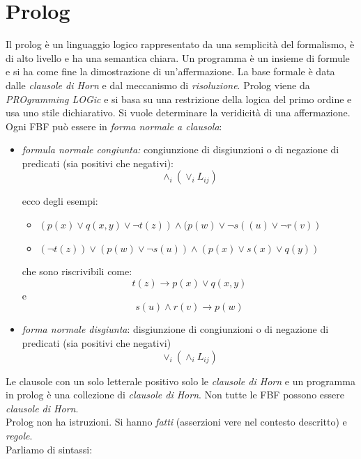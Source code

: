 \documentclass[a4paper,12pt, oneside]{book}
\begin{document}
\chapter{Prolog}
Il prolog è un linguaggio logico rappresentato da una semplicità del formalismo, è di alto livello e ha una semantica chiara. Un programma è un insieme di formule e si ha come fine la dimostrazione di un'affermazione. La base formale è data dalle \textit{clausole di Horn} e dal meccanismo di \textit{risoluzione}. Prolog viene da \textit{PROgramming LOGic} e si basa su una restrizione della logica del primo ordine e usa uno stile dichiarativo. Si vuole determinare la veridicità di una affermazione. Ogni FBF può essere in \textit{forma normale a clausola}:
\begin{itemize}
\item \textit{formula normale congiunta:} congiunzione di disgiunzioni o di negazione di predicati (sia positivi che negativi):
$$\wedge_i(\vee_iL_{ij})$$
\begin{esempio}
ecco degli esempi:
\begin{itemize}
\item $(p(x)\vee q(x,y)\vee \neg t(z))\wedge(p(w)\vee\neg s((u)\vee \neg r(v))$
\item $(\neg t(z))\vee (p(w)\vee\neg s(u))\wedge (p(x)\vee s(x)\vee q(y))$
\end{itemize}
che sono riscrivibili come:
$$t(z)\to p(x)\vee q(x,y)$$
e
$$s(u)\wedge r(v)\to p(w)$$
\end{esempio}
\item \textit{forma normale disgiunta}: disgiunzione di congiunzioni o di negazione di predicati (sia positivi che negativi)
$$\vee_i(\wedge_iL_{ij})$$
\end{itemize}
Le clausole con un solo letterale positivo solo le \textit{clausole di Horn} e un programma in prolog è una collezione di \textit{clausole di Horn}. Non tutte le FBF possono essere \textit{clausole di Horn}.\\
Prolog non ha istruzioni. Si hanno \textit{fatti} (asserzioni vere nel contesto descritto) e \textit{regole}.\\
Parliamo di sintassi:
\end{document}
